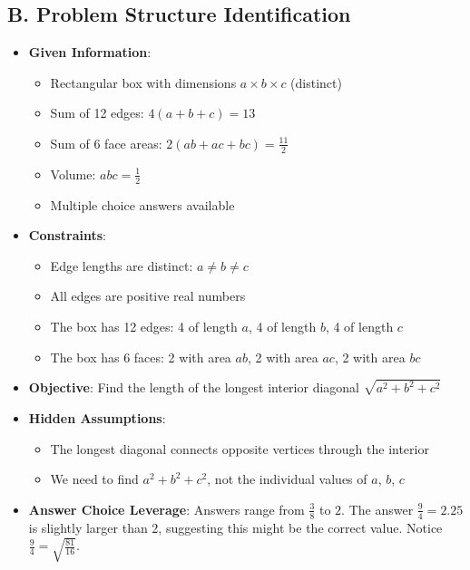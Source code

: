\documentclass[12pt]{article}
\begin{document}
\begin{problemconfigbox}
\subsection*{B. Problem Structure Identification}
\begin{itemize}[leftmargin=*]
    \item \textbf{Given Information}: 
    \begin{itemize}
        \item Rectangular box with dimensions $a \times b \times c$ (distinct)
        \item Sum of 12 edges: $4(a+b+c) = 13$
        \item Sum of 6 face areas: $2(ab+ac+bc) = \frac{11}{2}$
        \item Volume: $abc = \frac{1}{2}$
        \item Multiple choice answers available
    \end{itemize}
    \item \textbf{Constraints}: 
    \begin{itemize}
        \item Edge lengths are distinct: $a \neq b \neq c$
        \item All edges are positive real numbers
        \item The box has 12 edges: 4 of length $a$, 4 of length $b$, 4 of length $c$
        \item The box has 6 faces: 2 with area $ab$, 2 with area $ac$, 2 with area $bc$
    \end{itemize}
    \item \textbf{Objective}: Find the length of the longest interior diagonal $\sqrt{a^2+b^2+c^2}$
    \item \textbf{Hidden Assumptions}: 
    \begin{itemize}
        \item The longest diagonal connects opposite vertices through the interior
        \item We need to find $a^2+b^2+c^2$, not the individual values of $a$, $b$, $c$
    \end{itemize}
    \item \textbf{Answer Choice Leverage}: Answers range from $\frac{3}{8}$ to $2$. The answer $\frac{9}{4} = 2.25$ is slightly larger than 2, suggesting this might be the correct value. Notice $\frac{9}{4} = \sqrt{\frac{81}{16}}$.
\end{itemize}


\end{problemconfigbox}
\end{document}
